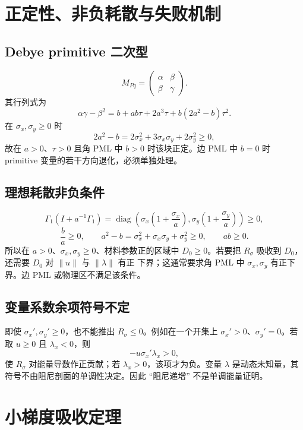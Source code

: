 \documentclass[UTF8,a4paper,11pt]{ctexart}
\newcommand{\sx}{\sigma_x}
\newcommand{\sy}{\sigma_y}
\newcommand{\diag}{\operatorname{diag}}
\begin{document}
\section{正定性、非负耗散与失败机制}

\subsection{Debye primitive 二次型}

\[
M_{Pq}=\begin{pmatrix}\alpha&\beta\\ \beta&\gamma\end{pmatrix}.
\]
其行列式为
\[
\alpha\gamma-\beta^2
=b+ab\tau+2a^3\tau+b(2a^2-b)\tau^2.
\]
在 \(\sx,\sy\ge0\) 时
\[
2a^2-b=2\sx^2+3\sx\sy+2\sy^2\ge0,
\]
故在 \(a>0\)、\(\tau>0\) 且角 PML 中 \(b>0\) 时该块正定。边 PML 中 \(b=0\)
时 primitive 变量的若干方向退化，必须单独处理。

\subsection{理想耗散非负条件}

\[
\Gamma_1(I+a^{-1}\Gamma_1)
=\diag\left(\sx\left(1+\frac{\sx}{a}\right),
\sy\left(1+\frac{\sy}{a}\right)\right)\ge0,
\]
\[
\frac{b}{a}\ge0,\qquad a^2-b=\sx^2+\sx\sy+\sy^2\ge0,\qquad ab\ge0.
\]
所以在 \(a>0\)、\(\sx,\sy\ge0\)、材料参数正的区域中 \(D_0\ge0\)。若要把
\(R_\sigma\) 吸收到 \(D_0\)，还需要 \(D_0\) 对 \(\|u\|\) 与 \(\|\lambda\|\) 有正
下界；这通常要求角 PML 中 \(\sx,\sy\) 有正下界。边 PML 或物理区不满足该条件。

\subsection{变量系数余项符号不定}

即使 \(\sx',\sy'\ge0\)，也不能推出 \(R_\sigma\le0\)。例如在一个开集上
\(\sx'>0\)、\(\sy'=0\)。若取 \(u\ge0\) 且 \(\lambda_x<0\)，则
\[
-u\sx'\lambda_x>0,
\]
使 \(R_\sigma\) 对能量导数作正贡献；若 \(\lambda_x>0\)，该项才为负。变量
\(\lambda\) 是动态未知量，其符号不由阻尼剖面的单调性决定。因此 ``阻尼递增''
不是单调能量证明。

\section{小梯度吸收定理}
\end{document}
